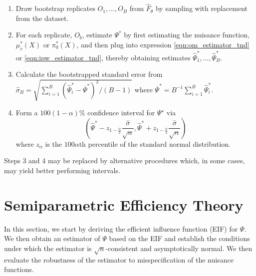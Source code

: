 \begin{appendix}
\begin{enumerate}
    \item Draw bootstrap replicates $O_1, \ldots, O_B$ from $\widehat{F}_{\theta}$ by sampling with replacement from the dataset. 
    \item For each replicate, $O_b$, estimate $\Psi^*$ by first estimating the nuisance function, $\mu^*_v(X)$ or $\pi_0^*(X)$, and then plug into expression \ref{eqn:om_estimator_tnd} or \ref{eqn:ipw_estimator_tnd}, thereby obtaining estimates $\widehat{\Psi}^*_1, \ldots, \widehat{\Psi}^*_B$.
    \item Calculate the bootstrapped standard error from $\widehat{\sigma}_B = \sqrt{ \sum_{i=1}^{B} (\widehat{\Psi}^*_i - \overline{\Psi}^*)^2/(B-1)}$ where $\overline{\Psi}^* = B^{-1}\sum_{i=1}^B \widehat{\Psi}^*_i$.
    \item Form a $100(1-\alpha)\%$ confidence interval for $\Psi^{\star}$ via
    $$
    \left(\widehat{\Psi}^*-z_{1-\frac{\alpha}{2}} \frac{\widehat{\sigma}}{\sqrt{n}}, \widehat{\Psi}^*+z_{1-\frac{\alpha}{2}} \frac{\widehat{\sigma}}{\sqrt{n}}\right)
    $$
    where $z_\alpha$ is the $100 \alpha$th percentile of the standard normal distribution.
\end{enumerate}
 Steps 3 and 4 may be replaced by alternative procedures which, in some cases, may yield better performing intervals.
    \newpage

    \section{Semiparametric Efficiency Theory}\label{sec:eif}
    In this section, we start by deriving the efficient influence function (EIF) for $\Psi$. We then obtain an estimator of $\Psi$ based on the EIF and establish the conditions under which the estimator is $\sqrt{n}$-consistent and asymptotically normal. We then evaluate the robustness of the estimator to misspecification of the nuisance functions. 
    

\end{appendix}
